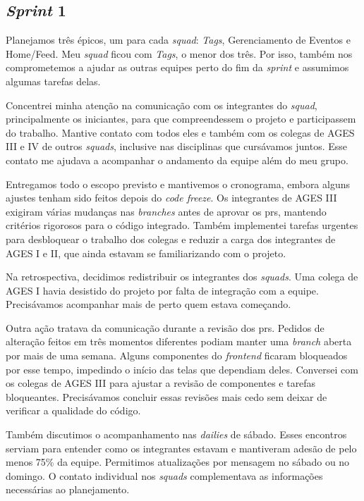\subsection{\textit{Sprint} 1}

Planejamos três épicos, um para cada \textit{squad}: \textit{Tags}, Gerenciamento de
Eventos e Home/Feed. Meu \textit{squad} ficou com \textit{Tags}, o menor dos três.
Por isso, também nos comprometemos a ajudar as outras equipes perto do fim
da \textit{sprint} e assumimos algumas tarefas delas.

Concentrei minha atenção na comunicação com os integrantes do
\textit{squad}, principalmente os iniciantes, para que compreendessem o
projeto e participassem do trabalho. Mantive contato com todos eles e também
com os colegas de AGES III e IV de outros \textit{squads}, inclusive nas
disciplinas que cursávamos juntos. Esse contato me ajudava a acompanhar o
andamento da equipe além do meu grupo.

Entregamos todo o escopo previsto e mantivemos o cronograma, embora alguns
ajustes tenham sido feitos depois do \textit{code freeze}. Os integrantes de
AGES III exigiram várias mudanças nas \textit{branches} antes de aprovar os
\acp{pr}, mantendo critérios rigorosos para o código integrado. Também
implementei tarefas urgentes para desbloquear o trabalho dos colegas e
reduzir a carga dos integrantes de AGES I e II, que ainda estavam se
familiarizando com o projeto.

Na retrospectiva, decidimos redistribuir os integrantes dos \textit{squads}.
Uma colega de AGES I havia desistido do projeto por falta de integração com
a equipe. Precisávamos acompanhar mais de perto quem estava começando.

Outra ação tratava da comunicação durante a revisão dos \acp{pr}.
Pedidos de alteração feitos em três momentos diferentes podiam manter uma
\textit{branch} aberta por mais de uma semana. Alguns componentes do
\textit{frontend} ficaram bloqueados por esse tempo, impedindo o início das
telas que dependiam deles. Conversei com os colegas de AGES III para ajustar
a revisão de componentes e tarefas bloqueantes. Precisávamos concluir essas
revisões mais cedo sem deixar de verificar a qualidade do código.

Também discutimos o acompanhamento nas \textit{dailies} de sábado.
Esses encontros serviam para entender como os integrantes estavam e
mantiveram adesão de pelo menos 75\% da equipe. Permitimos atualizações por
mensagem no sábado ou no domingo. O contato individual nos \textit{squads}
complementava as informações necessárias ao planejamento.

